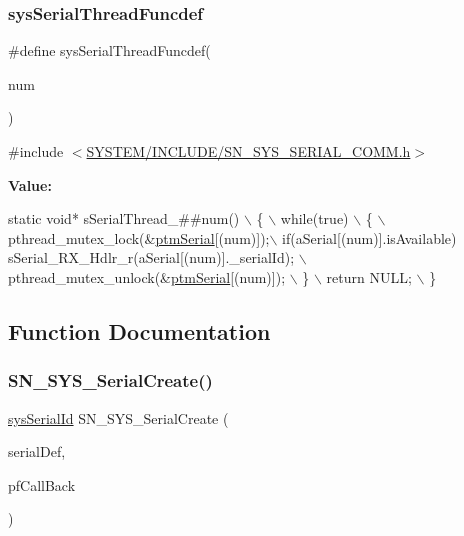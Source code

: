 \subsubsection{\texorpdfstring{sys\+Serial\+Thread\+Funcdef}{sysSerialThreadFuncdef}}
{\footnotesize\ttfamily \#define sys\+Serial\+Thread\+Funcdef(\begin{DoxyParamCaption}\item[{}]{num }\end{DoxyParamCaption})}



{\ttfamily \#include $<$\hyperlink{SN__SYS__SERIAL__COMM_8h}{S\+Y\+S\+T\+E\+M/\+I\+N\+C\+L\+U\+D\+E/\+S\+N\+\_\+\+S\+Y\+S\+\_\+\+S\+E\+R\+I\+A\+L\+\_\+\+C\+O\+M\+M.\+h}$>$}

{\bfseries Value\+:}
\begin{DoxyCode}
\textcolor{keyword}{static} \textcolor{keywordtype}{void}* sSerialThread\_##num() \(\backslash\)
    \{ \(\backslash\)
        while(\textcolor{keyword}{true}) \(\backslash\)
        \{ \(\backslash\)
            pthread\_mutex\_lock(&\hyperlink{SN__SYS__SERIAL__COMM_8c_ae4f4b16513b013ebb5f6b62e64d5bd3e}{ptmSerial}[(num)]);\(\backslash\)
            if(aSerial[(num)].isAvailable) sSerial\_RX\_Hdlr\_r(aSerial[(num)].\_serialId); \(\backslash\)
            pthread\_mutex\_unlock(&\hyperlink{SN__SYS__SERIAL__COMM_8c_ae4f4b16513b013ebb5f6b62e64d5bd3e}{ptmSerial}[(num)]); \(\backslash\)
        \} \(\backslash\)
        return NULL; \(\backslash\)
    \}
\end{DoxyCode}


\subsection{Function Documentation}
\mbox{\label{group__SYSTEM__SERIAL__COMM_gaca93cc653a4c4657a762050b4228db3e}} 
\subsubsection{\texorpdfstring{S\+N\+\_\+\+S\+Y\+S\+\_\+\+Serial\+Create()}{SN\_SYS\_SerialCreate()}}
{\footnotesize\ttfamily \hyperlink{structsys__serial__id}{sys\+Serial\+Id} S\+N\+\_\+\+S\+Y\+S\+\_\+\+Serial\+Create (\begin{DoxyParamCaption}\item[{const \hyperlink{structsys__serial__def}{sys\+Serial\+Def\+\_\+t} $\ast$}]{serial\+Def,  }\item[{void $\ast$($\ast$)(char $\ast$)}]{pf\+Call\+Back }\end{DoxyParamCaption})}



